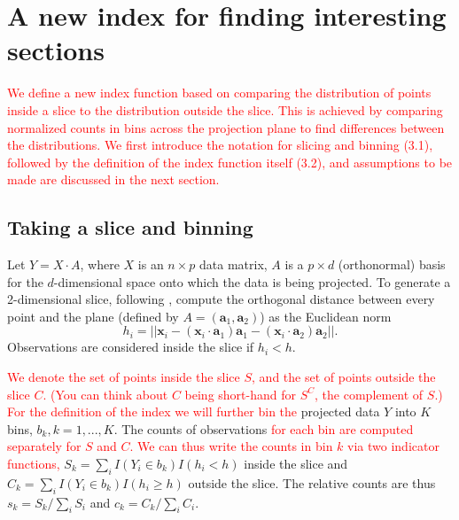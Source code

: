 \documentclass[]{interact}
\theoremstyle{plain}%
\theoremstyle{definition}
\theoremstyle{remark}
\begin{document}
\hypertarget{a-new-index-for-finding-interesting-sections}{%
\section{\texorpdfstring{A new index for finding interesting sections
\label{sec:index}}{A new index for finding interesting sections }}\label{a-new-index-for-finding-interesting-sections}}

\textcolor{red}{We define a new index function based on comparing the distribution of points inside a slice to the distribution outside the slice. This is achieved by comparing normalized counts in bins across the projection plane to find differences between the distributions. We first introduce the notation for slicing and binning (3.1), followed by the definition of the index function itself (3.2), and assumptions to be made are discussed in the next section.
}

\hypertarget{taking-a-slice-and-binning}{%
\subsection{Taking a slice and
binning}\label{taking-a-slice-and-binning}}

Let \(Y=X\cdot A\), where \(X\) is an \(n\times p\) data matrix, \(A\)
is a \(p\times d\) (orthonormal) basis for the \(d\)-dimensional space
onto which the data is being projected. To generate a 2-dimensional
slice, following \citet{laa2019slice}, compute the orthogonal distance
between every point and the plane (defined by
\(A = (\mathbf{a}_1, \mathbf{a}_2)\)) as the Euclidean norm
\begin{equation}
h_i = ||\mathbf{x}_i - (\mathbf{x}_i\cdot \mathbf{a}_1) \mathbf{a}_1 - (\mathbf{x}_i\cdot \mathbf{a}_2) \mathbf{a}_2||.
\end{equation} Observations are considered inside the slice if
\(h_i < h\).

\textcolor{red}{We denote the set of points inside the slice $S$, and the set of points outside the slice $C$. (You can think about $C$ being short-hand for $S^C$, the complement of $S$.) For the definition of the index we will further bin the}
projected data \(Y\) into \(K\) bins, \(b_k, k=1, ..., K\). The counts
of observations
\textcolor{red}{for each bin are computed separately for $S$ and $C$. We can thus write the counts in bin $k$ via two indicator functions,}
\(S_{k}=\sum_{i} I(Y_i \in b_{k})I(h_i < h)\) inside the slice and
\(C_{k}=\sum_{i} I(Y_i \in b_{k})I(h_i \geq h)\) outside the slice. The
relative counts are thus \(s_k = S_k / \sum_i S_i\) and
\(c_k = C_k / \sum_i C_i\).
\end{document}
